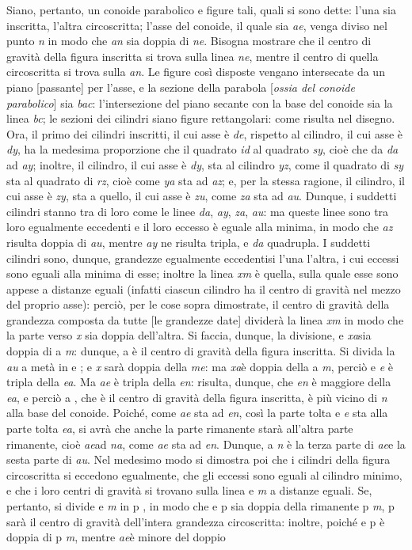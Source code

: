 \documentclass[11pt,twoside,openany]{book}
\begin{document}
Siano, pertanto, un conoide parabolico e figure tali, quali si sono dette: l'una sia inscritta, l'altra circoscritta; l'asse del conoide, il quale sia \emph{ae}, venga diviso nel punto \emph{n} in modo che \emph{an} sia doppia di \emph{ne}. Bisogna mostrare che il centro di gravità della figura inscritta si trova sulla linea \emph{ne}, mentre il centro di quella circoscritta si trova sulla \emph{an}. Le figure così disposte vengano intersecate da un piano [passante] per l'asse, e la sezione della parabola [\emph{ossia del conoide parabolico}] sia \emph{bac}: l'intersezione del piano secante con la base del conoide sia la linea \emph{bc}; le sezioni dei cilindri siano figure rettangolari: come risulta nel disegno. Ora, il primo dei cilindri inscritti, il cui asse è \emph{de}, rispetto al cilindro, il cui asse è \emph{dy}, ha la medesima proporzione che il quadrato \emph{id} al quadrato \emph{sy}, cioè che da \emph{da} ad \emph{ay}; inoltre, il cilindro, il cui asse è \emph{dy}, sta al cilindro \emph{yz}, come il quadrato di \emph{sy} sta al quadrato di \emph{rz}, cioè come \emph{ya} sta ad \emph{az}; e, per la stessa ragione, il cilindro, il cui asse è \emph{zy}, sta a quello, il cui asse è \emph{zu}, come \emph{za} sta ad \emph{au}. Dunque, i suddetti cilindri stanno tra di loro come le linee \emph{da}, \emph{ay}, \emph{za}, \emph{au}: ma queste linee sono tra loro egualmente eccedenti e il loro eccesso è eguale alla minima, in modo che \emph{az} risulta doppia di \emph{au}, mentre \emph{ay} ne risulta tripla, e \emph{da} quadrupla. I suddetti cilindri sono, dunque, grandezze egualmente eccedentisi l'una l'altra, i cui eccessi sono eguali alla minima di esse; inoltre la linea \emph{xm} è quella, sulla quale esse sono appese a distanze eguali (infatti ciascun cilindro ha il centro di gravità nel mezzo del proprio asse): perciò, per le cose sopra dimostrate, il centro di gravità della grandezza composta da tutte [le grandezze date] dividerà la linea \emph{xm} in modo che la parte verso \emph{x} sia doppia dell'altra. Si faccia, dunque, la divisione, e \emph{xa}sia doppia di a \emph{m}: dunque, a è il centro di gravità della figura inscritta. Si divida la \emph{au} a metà in e ; e \emph{x} sarà doppia della \emph{me}: ma \emph{xa}è doppia della a \emph{m}, perciò e \emph{e} è tripla della \emph{ea}. Ma \emph{ae} è tripla della \emph{en}: risulta, dunque, che \emph{en} è maggiore della \emph{ea}, e perciò a , che è il centro di gravità della figura inscritta, è più vicino di \emph{n} alla base del conoide. Poiché, come \emph{ae} sta ad \emph{en}, così la parte tolta e \emph{e} sta alla parte tolta \emph{ea}, si avrà che anche la parte rimanente starà all'altra parte rimanente, cioè \emph{ae}ad \emph{na}, come \emph{ae} sta ad \emph{en}. Dunque, a \emph{n} è la terza parte di \emph{ae}e la sesta parte di \emph{au}. Nel medesimo modo si dimostra poi che i cilindri della figura circoscritta si eccedono egualmente, che gli eccessi sono eguali al cilindro minimo, e che i loro centri di gravità si trovano sulla linea e \emph{m} a distanze eguali. Se, pertanto, si divide e \emph{m} in p , in modo che e p sia doppia della rimanente p \emph{m}, p sarà il centro di gravità dell'intera grandezza circoscritta: inoltre, poiché e p è doppia di p \emph{m}, mentre \emph{ae}è minore del doppio 
\end{document}
